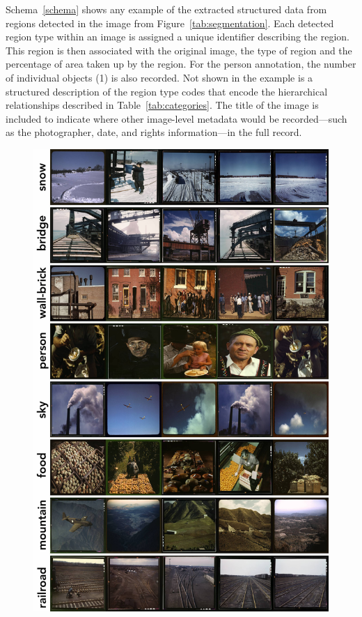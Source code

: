 \documentclass[10pt, a4paper]{article}
\begin{document}
Schema~\ref{schema} shows any example of the extracted structured data from
regions detected in the image from Figure~\ref{tab:segmentation}. Each detected
region type within an image is assigned a unique identifier describing the
region. This region is then associated with the original image, the type of
region and the percentage of area taken up by the region. For the person
annotation, the number of individual objects (1) is also recorded. Not shown
in the example is a structured description of the region type codes that
encode the hierarchical relationships described in Table~\ref{tab:categories}.
The title of the image is included to indicate where other image-level metadata
would be recorded---such as the photographer, date, and rights information---in
the full record.

\begin{figure}[!ht]
\begin{center}
\includegraphics[height=0.9\textheight]{../figures/max_category_grid_labels.jpg}

\end{center}
\end{figure}
\end{document}
